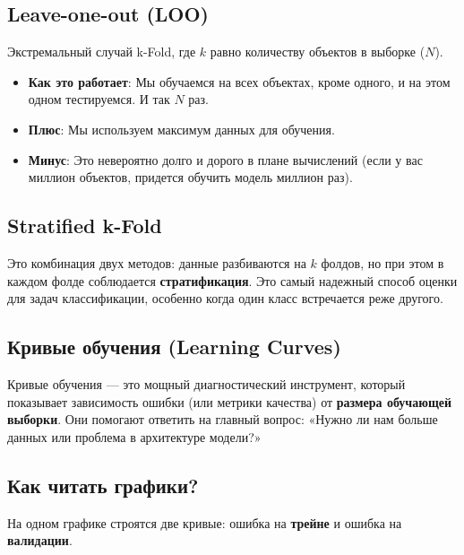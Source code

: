 \documentclass[12pt]{article}
\begin{document}
\subsection{Leave-one-out (LOO)}
Экстремальный случай k-Fold, где $k$ равно количеству объектов в выборке ($N$).
\begin{itemize}
    \item \textbf{Как это работает}: Мы обучаемся на всех объектах, кроме одного, и на этом одном тестируемся. И так $N$ раз.
    \item \textbf{Плюс}: Мы используем максимум данных для обучения.
    \item \textbf{Минус}: Это невероятно долго и дорого в плане вычислений (если у вас миллион объектов, придется обучить модель миллион раз).
\end{itemize}

\subsection{Stratified k-Fold}
Это комбинация двух методов: данные разбиваются на $k$ фолдов, но при этом в каждом фолде соблюдается \textbf{стратификация}. 
Это самый надежный способ оценки для задач классификации, особенно когда один класс встречается реже другого.

\subsection{Кривые обучения (Learning Curves)}
Кривые обучения — это мощный диагностический инструмент, который показывает зависимость ошибки (или метрики качества) от \textbf{размера обучающей выборки}. Они помогают ответить на главный вопрос: «Нужно ли нам больше данных или проблема в архитектуре модели?»

\subsection{Как читать графики?}
На одном графике строятся две кривые: ошибка на \textbf{трейне} и ошибка на \textbf{валидации}.
\end{document}
